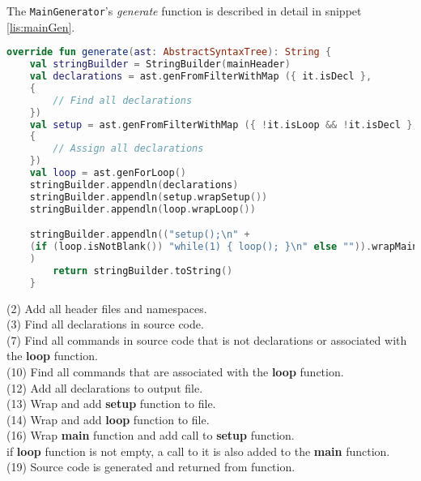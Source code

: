 The \texttt{MainGenerator}'s \textit{generate} function is described in detail in snippet \ref{lis:mainGen}.
\begin{lstlisting}[language=Kotlin,label=lis:mainGen,caption=The implementation of \textit{generate} in \texttt{MainGenerator}.]
override fun generate(ast: AbstractSyntaxTree): String {
	val stringBuilder = StringBuilder(mainHeader)
	val declarations = ast.genFromFilterWithMap ({ it.isDecl }, 
	{
		// Find all declarations	
	})
	val setup = ast.genFromFilterWithMap ({ !it.isLoop && !it.isDecl }, 
	{
	    // Assign all declarations
	})
	val loop = ast.genForLoop()
	stringBuilder.appendln(declarations)
	stringBuilder.appendln(setup.wrapSetup())
	stringBuilder.appendln(loop.wrapLoop())

	stringBuilder.appendln(("setup();\n" +
	(if (loop.isNotBlank()) "while(1) { loop(); }\n" else "")).wrapMain()
	)
		return stringBuilder.toString()
	}
\end{lstlisting}
(2) Add all header files and namespaces.\\ 
(3) Find all declarations in source code.\\
(7) Find all commands in source code that is not declarations or associated with the \textbf{loop} function.\\
(10) Find all commands that are associated with the \textbf{loop} function.\\
(12) Add all declarations to output file.\\
(13) Wrap and add \textbf{setup} function to file.\\
(14) Wrap and add \textbf{loop} function to file.\\
(16) Wrap \textbf{main} function and add call to \textbf{setup} function.\\
if \textbf{loop} function is not empty, a call to it is also added to the \textbf{main} function.\\
(19) Source code is generated and returned from function. 

